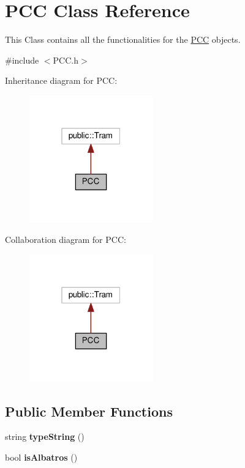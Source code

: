 \hypertarget{classPCC}{}\section{P\+CC Class Reference}
\label{classPCC}


This Class contains all the functionalities for the \hyperlink{classPCC}{P\+CC} objects.  




{\ttfamily \#include $<$P\+C\+C.\+h$>$}



Inheritance diagram for P\+CC\+:\nopagebreak
\begin{figure}[H]
\begin{center}
\leavevmode
\includegraphics[width=151pt]{classPCC__inherit__graph}
\end{center}
\end{figure}


Collaboration diagram for P\+CC\+:\nopagebreak
\begin{figure}[H]
\begin{center}
\leavevmode
\includegraphics[width=151pt]{classPCC__coll__graph}
\end{center}
\end{figure}
\subsection*{Public Member Functions}
\begin{DoxyCompactItemize}
\item 
string {\bfseries type\+String} ()\hypertarget{classPCC_a6cc8b127dc4790be8e73c974704903eb}{}\label{classPCC_a6cc8b127dc4790be8e73c974704903eb}

\item 
bool {\bfseries is\+Albatros} ()\hypertarget{classPCC_aebc2128b783f1013ec39fa55a2df7276}{}\label{classPCC_aebc2128b783f1013ec39fa55a2df7276}

\end{DoxyCompactItemize}


